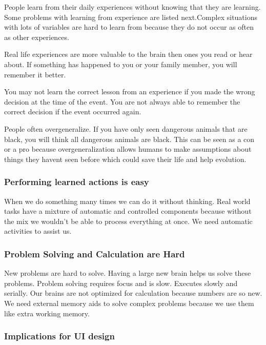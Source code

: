 \documentclass[11pt,]{article}
\begin{document}
People learn from their daily experiences without knowing that they are
learning. Some problems with learning from experience are listed
next.Complex situations with lots of variables are hard to learn from
because they do not occur as often as other experiences.

Real life experiences are more valuable to the brain then ones you read
or hear about. If something has happened to you or your family member,
you will remember it better.

You may not learn the correct lesson from an experience if you made the
wrong decision at the time of the event. You are not always able to
remember the correct decision if the event occurred again.

People often overgeneralize. If you have only seen dangerous animals
that are black, you will think all dangerous animals are black. This can
be seen as a con or a pro because overgeneralization allows humans to
make assumptions about things they havent seen before which could save
their life and help evolution.

\hypertarget{performing-learned-actions-is-easy}{%
\subsubsection{Performing learned actions is
easy}\label{performing-learned-actions-is-easy}}

When we do something many times we can do it without thinking. Real
world tasks have a mixture of automatic and controlled components
because without the mix we wouldn't be able to process everything at
once. We need automatic activities to assist us.

\hypertarget{problem-solving-and-calculation-are-hard}{%
\subsubsection{Problem Solving and Calculation are
Hard}\label{problem-solving-and-calculation-are-hard}}

New problems are hard to solve. Having a large new brain helps us solve
these problems. Problem solving requires focus and is slow. Executes
slowly and serially. Our brains are not optimized for calculation
because numbers are so new. We need external memory aids to solve
complex problems because we use them like extra working memory.

\hypertarget{implications-for-ui-design}{%
\subsubsection{Implications for UI
design}\label{implications-for-ui-design}}
\end{document}
